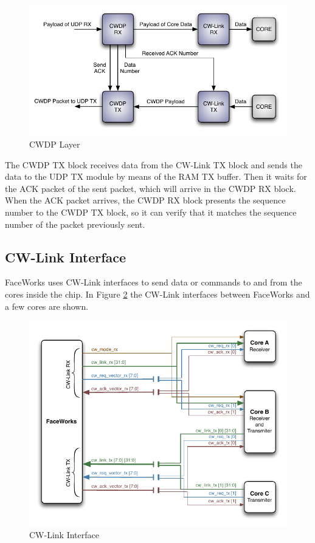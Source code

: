 \documentclass[defaultstyle,10pt,master,Helvetica]{thesis}
\begin{document}
\begin{figure}[h]
  \centering
      \includegraphics[scale=1]{Diagrams/CWDP-simplified-transaction.pdf}
  \caption{\ac{CWDP} Layer}
  \label{fig:cwdp-transac}
\end{figure}

The \ac{CWDP} TX block receives data from the CW-Link TX block and sends the data to the \ac{UDP} TX module by means of the \acs{RAM} TX buffer. Then it waits for the \ac{ACK} packet of the sent packet, which will arrive in the \ac{CWDP} RX block. When the \ac{ACK} packet arrives, the \ac{CWDP} RX block presents the sequence number to the \ac{CWDP} TX block, so it can verify that it matches the sequence number of the packet previously sent.
\clearpage

\subsection{CW-Link Interface}
FaceWorks uses CW-Link interfaces\cite{Facedata} to send data or commands to and from the cores inside the chip. In Figure \ref{fig:cwdp-diagram} the CW-Link interfaces between FaceWorks and a few cores are shown.

\begin{figure}[h]
  \centering
      \includegraphics[scale=1.3]{Diagrams/CW-Link-Diag.pdf}
  \caption{CW-Link Interface}
  \label{fig:cwdp-diagram}
\end{figure}
\end{document}

